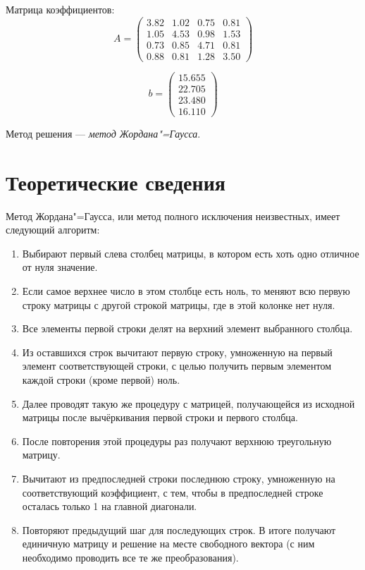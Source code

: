 \documentclass[a4paper,12pt,notitlepage,headsepline,pdftex]{scrartcl}
\begin{document}
  Матрица коэффициентов:
  \begin{equation}
    A = \left(\begin{matrix}
          3.82 & 1.02 & 0.75 & 0.81\\
          1.05 & 4.53 & 0.98 & 1.53\\
          0.73 & 0.85 & 4.71 & 0.81\\
          0.88 & 0.81 & 1.28 & 3.50\end{matrix}\right)
    \label{eq:A}
  \end{equation}

  \begin{equation}
    b = \left( \begin{matrix}
      15.655\\
      22.705\\
      23.480\\
      16.110
    \end{matrix}\right)
    \label{eq:b}
  \end{equation}

  Метод решения --- \emph{метод Жордана"=Гаусса}.
\newpage
\section{Теоретические сведения}
  Метод Жордана"=Гаусса, или метод полного исключения неизвестных, имеет
  следующий алгоритм:

  \begin{enumerate}
    \item Выбирают первый слева столбец матрицы, в котором есть хоть одно
      отличное от нуля значение.
    \item Если самое верхнее число в этом столбце есть ноль, то меняют всю
      первую строку матрицы с другой строкой матрицы, где в этой колонке нет
      нуля.
    \item Все элементы первой строки делят на верхний элемент выбранного
      столбца.
    \item Из оставшихся строк вычитают первую строку, умноженную на первый
      элемент соответствующей строки, с целью получить первым элементом каждой
      строки (кроме первой) ноль.
    \item Далее проводят такую же процедуру с матрицей, получающейся из
      исходной матрицы после вычёркивания первой строки и первого столбца.
    \item После повторения этой процедуры  раз получают верхнюю треугольную
      матрицу.
    \item Вычитают из предпоследней строки последнюю строку, умноженную на
      соответствующий коэффициент, с тем, чтобы в предпоследней строке
      осталась только 1 на главной диагонали.
    \item Повторяют предыдущий шаг для последующих строк.
      В итоге получают единичную матрицу и решение на месте свободного вектора
      (с ним необходимо проводить все те же преобразования).
  \end{enumerate}
\newpage
\end{document}
